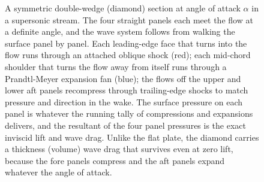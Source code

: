 \begin{figure}[htbp]
\centering
{}
\caption[Double-wedge diamond airfoil in supersonic flow]{A symmetric
double-wedge (diamond) section at angle of attack $\alpha$ in a
supersonic stream. The four straight panels each meet the flow at a
definite angle, and the wave system follows from walking the surface
panel by panel. Each leading-edge face that turns into the flow runs
through an attached oblique shock (red); each mid-chord shoulder that
turns the flow away from itself runs through a Prandtl-Meyer expansion
fan (blue); the flows off the upper and lower aft panels recompress
through trailing-edge shocks to match pressure and direction in the
wake. The surface pressure on each panel is whatever the running tally
of compressions and expansions delivers, and the resultant of the four
panel pressures is the exact inviscid lift and wave drag. Unlike the
flat plate, the diamond carries a thickness (volume) wave drag that
survives even at zero lift, because the fore panels compress and the
aft panels expand whatever the angle of attack.}
\label{fig:vol03ch13:diamond-airfoil}
\end{figure}
